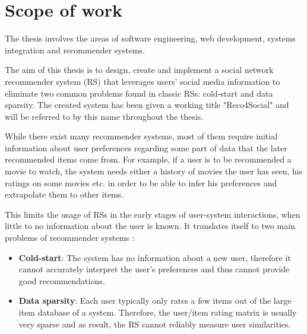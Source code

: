 \documentclass[12pt]{report}
\begin{document}

\section{Scope of work}
The thesis involves the areas of software engineering, web development, systems integration and recommender systems.

The aim of this thesis is to design, create and implement a social network recommender system (RS) that leverages users' social media information to eliminate two common problems found in classic RSs: cold-start and data sparsity. The created system has been given a working title "Reco4Social" and will be referred to by this name throughout the thesis.

\hbox{}
While there exist many recommender systems, most of them require initial information about user preferences regarding some part of data that the later recommended items come from. For example, if a user is to be recommended a movie to watch, the system needs either a history of movies the user has seen, his ratings on some movies etc. in order to be able to infer his preferences and extrapolate them to other items. 

This limits the usage of RSs in the early stages of user-system interactions, when little to no information about the user is known. It translates itself to two main problems of recommender systems \cite{snrs}:
\begin{itemize}
\item {\bf Cold-start}: The system has no information about a new user, therefore it cannot accurately interpret the user's preferences and thus cannot provide good recommendations.
\item {\bf Data sparsity}: Each user typically only rates a few items out of the large item database of a system. Therefore, the user/item rating matrix is usually very sparse and as result, the RS cannot reliably measure user similarities.
\end{itemize}
\end{document}
